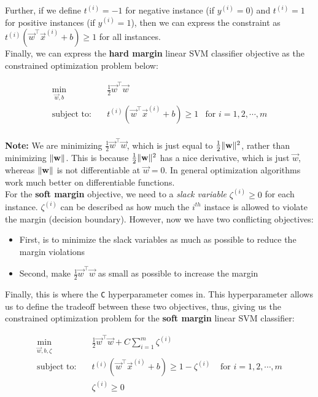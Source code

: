 \noindent
Further, if we define $t^{(i)} = -1$ for negative instance (if $y^{(i)} = 0$) and $t^{(i)} = 1$ for positive
instances (if $y^{(i)} = 1$), then we can express the constraint as $t^{(i)}(\vec{w}^{\intercal}\vec{x}^{(i)}+b) \geq 1$
for all instances.\\

\noindent
Finally, we can express the \textbf{hard margin} linear SVM classifier objective as the constrained optimization 
problem below:

\[
\begin{aligned}
\min_{\vec{w},b} \quad & \frac{1}{2}\vec{w}^{\intercal}\vec{w}\\
\textrm{subject to:} \quad & t^{(i)}(\vec{w}^{\intercal}\vec{x}^{(i)}+b) \geq 1 & \textrm{for } i = 1, 2, \cdots, m
\end{aligned}
\] \\

\noindent
\textbf{Note:} We are minimizing $\frac{1}{2} \vec{w}^{\intercal}\vec{w}$, which is just equal to 
$\frac{1}{2} \lVert\mathbf{w}\rVert^{2}$, rather than minimizing $\lVert\mathbf{w}\rVert$. This is because $\frac{1}{2} \lVert\mathbf{w}\rVert^{2}$
has a nice derivative, which is just $\vec{w}$, whereas $\lVert\mathbf{w}\rVert$ is not differentiable at $\vec{w} = 0$. 
In general optimization algorithms work much better on differentiable functions.\\

\noindent
For the \textbf{soft margin} objective, we need to a \textit{slack variable} $\zeta^{(i)} \geq 0$ for each 
instance. $\zeta^{(i)}$ can be described as how much the $i^{th}$ instace is allowed to violate the margin
(decision boundary). However, now we have two conflicting objectives:

\begin{itemize}
    \item First, is to minimize the slack variables as much as possible to reduce the margin violations
    \item Second, make $\frac{1}{2} \vec{w}^{\intercal}\vec{w}$ as small as possible to increase the margin
\end{itemize}

\noindent
Finally, this is where the \texttt{C} hyperparameter comes in. This hyperparameter allows us to 
define the tradeoff between these two objectives, thus, giving us the constrained optimization problem for 
the \textbf{soft margin} linear SVM classifier:

\[
\begin{aligned}
\min_{\vec{w},b, \zeta} \quad & \frac{1}{2}\vec{w}^{\intercal}\vec{w} + C\sum^{m}_{i=1} \zeta^{(i)}\\
\textrm{subject to:} \quad & t^{(i)}(\vec{w}^{\intercal}\vec{x}^{(i)}+b) \geq 1 - \zeta^{(i)} & \textrm{ for } i = 1, 2, \cdots, m\\
                           & \zeta^{(i)} \geq 0
\end{aligned}
\]

